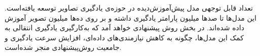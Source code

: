 تعداد قابل توجهی مدل پیش‌آموزش‌دیده در حوزه‌ی یادگیری تصاویر توسعه یافته‌است.
این مدل‌ها  تا صد‌ها میلیون پارامتر یادگیری داشته و بر روی ده‌ها میلیون تصویر آموزش داده شده‌اند. 
در بخش روش پیشنهادی خواهد آمد که به‌کارگیری یادگیری انتقالی به کمک این مدل‌ها، چگونه به کاهش نیازمندی‌های داده‌ای، افزایش سرعت یادگیری و جامعیت روش‌پیشنهادی منجر شده‌است.
